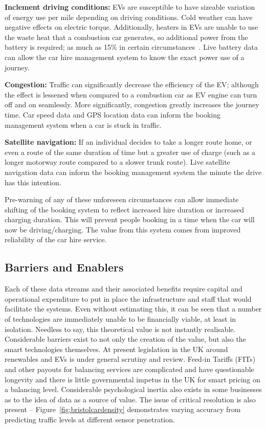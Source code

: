 \documentclass[conference]{IEEEtran}
\begin{document}
\begin{compactenum}
\item {\textbf{Inclement driving conditions:}} EVs are susceptible to
  have sizeable variation of energy use per mile depending on driving
  conditions. Cold weather can have negative effects on electric
  torque. Additionally, heaters in EVs are unable to use the waste
  heat that a combustion car generates, so additional power from the
  battery is required; as much as 15\% in certain
  circumstances~\cite{postevs:2010}. Live
  battery data can allow the car hire management system to know the
  exact power use of a journey.
\item {\textbf{Congestion:}} Traffic can significantly decrease the
  efficiency of the EV; although the effect is lessened when compared
  to a combustion car as EV engine can turn off and on
  seamlessly. More significantly, congestion greatly increases the
  journey time. Car speed data and GPS location data can inform the
  booking management system when a car is stuck in traffic.
\item {\textbf{Satellite navigation:}} If an individual decides to take a longer
  route home, or even a route of the same duration of time but a
  greater use of charge (such as a longer motorway route compared to a
  slower trunk route). Live satellite navigation data can inform the booking
  management system the minute the drive has this intention. 
\end{compactenum}

Pre-warning of any of these unforeseen circumstances can allow
immediate shifting of the booking system to reflect increased hire
duration or increased charging duration. This will prevent people
booking in a time when the car will now be driving/charging. The value
from this system comes from improved reliability of the car hire
service.

\subsection{Barriers and Enablers}

Each of these data streams and their associated benefits require
capital and operational expenditure to put in place the infrastructure
and staff that would facilitate the systems. Even without estimating
this, it can be seen that a number of technologies are immediately
unable to be financially viable, at least in isolation. Needless to
say, this theoretical value is not instantly realisable. Considerable
barriers exist to not only the creation of the value, but also the
smart technologies themselves. At present legislation in the UK around
renewables and EVs is under general scrutiny and review. Feed-in
Tariffs (FITs) and other payouts for balancing services are
complicated and have questionable longevity and there is little
governmental impetus in the UK for smart pricing on a balancing
level. Considerable psychological inertia also exists in some
businesses as to the idea of data as a source of value.  The issue of
critical resolution is also present --
Figure~\ref{fig:bristolcardensity} demonstrates varying accuracy from
predicting traffic levels at different sensor penetration.
\end{document}
